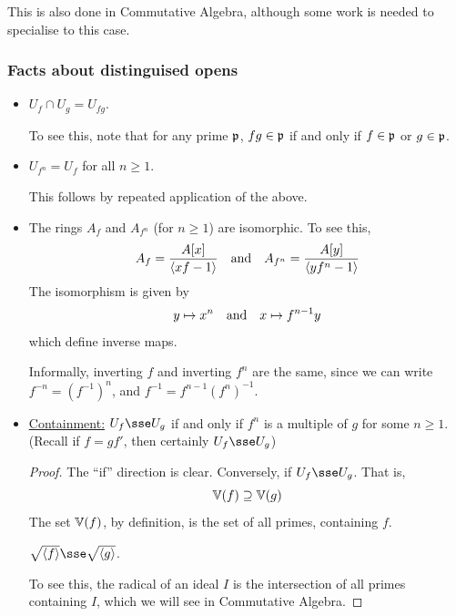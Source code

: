 \documentclass{article}
\begin{document}
\begin{addendum}
    This is also done in Commutative Algebra, although some work is needed to specialise to this case.
\end{addendum}

\subsubsection*{Facts about distinguised opens}

\begin{itemize}
    \item \(U_f \cap U_g = U_{fg}\). \begin{addendum}
        To see this, note that for any prime \(\mathfrak{p}\), \(fg \in \mathfrak{p}\) if and only if \(f \in \mathfrak{p}\) or \(g \in \mathfrak{p}\).
    \end{addendum}
    \item \(U_{f^n} = U_f\) for all \(n \ge 1\). \begin{addendum}
        This follows by repeated application of the above.
    \end{addendum}
    \item The rings \(A_f\) and \(A_{f^n}\) (for \(n \ge 1\)) are isomorphic. To see this,
    \[A_f = \frac{A[x]}{\inner{xf - 1}} \qqtext{and} A_{f^n} = \frac{A[y]}{\inner{yf^n - 1}}\]
    The isomorphism is given by
    \[y \mapsto x^n \qqtext{and} x \mapsto f^{n-1}y\]
    which define inverse maps. \begin{addendum}
        Informally, inverting \(f\) and inverting \(f^n\) are the same, since we can write \(f^{-n} = (f^{-1})^n\), and \(f^{-1} = f^{n-1}(f^n)^{-1}\).
    \end{addendum}
    \item \underline{Containment:} \(U_f \sse U_g\) if and only if \(f^n\) is a multiple of \(g\) for some \(n \ge 1\). (Recall if \(f = gf'\), then certainly \(U_f \sse U_g\))
    \begin{proof}
        The ``if'' direction is clear. Conversely, if \(U_f \sse U_g\). That is,
        \[\mathbb{V}(f) \supseteq \mathbb{V}(g)\]
        The set \(\mathbb{V}(f)\), by definition, is the set of all primes, containing \(f\).

        \begin{claim}
            \(\sqrt{\inner{f}} \sse \sqrt{\inner{g}}\).
        \end{claim}

        To see this, the radical of an ideal \(I\) is the intersection of all primes containing \(I\), which we will see in Commutative Algebra.
    \end{proof}
\end{itemize}
\end{document}
